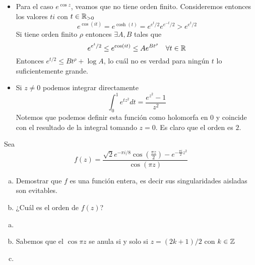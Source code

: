 \documentclass[twoside]{article}
\begin{document}
\begin{solucion}
\begin{itemize}
\item Para el caso $e^{\cos z}$, veamos que no tiene orden finito. Consideremos entonces los valores $ti$ con $t\in \mathbb{R}_{>0}$
$$
e^{\cos(it)}=e^{\cosh(t)}=e^{e^t/2}e^{e^{-t}/2} > e^{e^t/2}
$$
Si tiene orden finito $\rho$ entonces $\exists A, B$ tales que
$$
e^{e^t/2} \leq e^{\cos(it)} \leq Ae^{Bt^\rho} \quad \forall t\in \mathbb{R}$$
Entonces $e^{t/2}\leq Bt^\rho+\log A$, lo cuál no es verdad para ningún $t$ lo suficientemente grande.
\item Si $z\neq 0$ podemos integrar directamente
$$
\int_0^1 e^{tz^2}dt = \frac{e^{z^2}-1}{z^2}
$$
Notemos que podemos definir esta función como holomorfa en $0$ y coincide con el resultado de la integral tomando $z=0$. Es claro que el orden es $2$.
\end{itemize}

\end{solucion}

\newpage

\begin{ejercicio}{2}
Sea
$$
f(z)=\frac{\sqrt{2}e^{-\pi i/8}\cos\left(\frac{\pi z}{2}\right)-e^{-\frac{\pi i}{2}z^2}}{\cos(\pi z)}
$$
\begin{enumerate}[(a)]
\item Demostrar que $f$ es una función entera, es decir sus singularidades aisladas son evitables.
\item ¿Cuál es el orden de $f(z)$?
\end{enumerate}
\end{ejercicio}
\begin{solucion}
\begin{enumerate}[(a)]
\item[]
\item Sabemos que el $\cos \pi z$ se anula si y solo si $z=(2k+1)/2$ con $k\in \mathbb{Z}$
\item 
\end{enumerate}
\end{solucion}

\newpage
\end{document}

